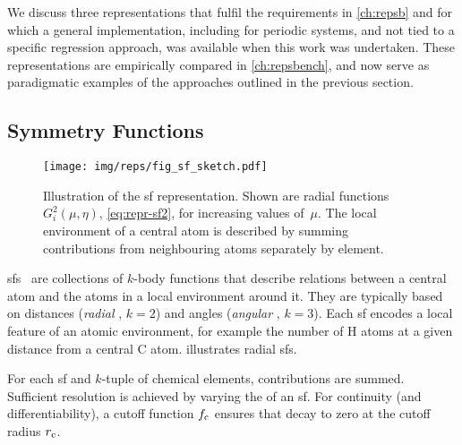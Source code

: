 We discuss three representations that fulfil the requirements in \cref{ch:repsb} and for which a general implementation, including for periodic systems, and not tied to a specific regression approach, was available when this work was undertaken.
These representations are empirically compared in \cref{ch:repsbench}, and now serve as paradigmatic examples of the approaches outlined in the previous section.

\subsection{Symmetry Functions}

\begin{figure*}
  \centering
  \texttt{[image: img/reps/fig\_sf\_sketch.pdf]}
  \caption{
  	Illustration of the \gls{sf} representation.
    Shown are radial functions $G_i^2(\mu,\eta)$, \cref{eq:repr-sf2}, for increasing values of~$\mu$.
	The local environment of a central atom is described by summing contributions from neighbouring atoms separately by element.
  }
  \label{fig:repr_sf}
\end{figure*}



\noindent
\Glspl{sf}~\cite{bp2007q,b2011Aq} are collections of $k$-body functions that describe relations between a central atom and the atoms in a local environment around it.
They are typically based on distances (\emph{radial} \sfs, $k{=}2$) and angles (\emph{angular} \sfs, $k{=}3$).
Each \gls{sf} encodes a local feature of an atomic environment, for example the number of H atoms at a given distance from a central C atom.  illustrates radial \glspl{sf}.

For each \gls{sf} and $k$-tuple of chemical elements, contributions are summed.
Sufficient resolution is achieved by varying the \hps of an \gls{sf}.
For continuity (and differentiability), a cutoff function $f_{\text{c}}$ ensures that \sfs decay to zero at the cutoff radius $r_{\text{c}}$.

